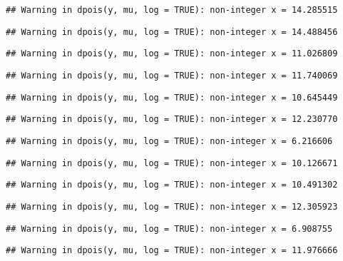 \documentclass[
]{article}
\begin{document}
\begin{verbatim}
## Warning in dpois(y, mu, log = TRUE): non-integer x = 14.285515
\end{verbatim}

\begin{verbatim}
## Warning in dpois(y, mu, log = TRUE): non-integer x = 14.488456
\end{verbatim}

\begin{verbatim}
## Warning in dpois(y, mu, log = TRUE): non-integer x = 11.026809
\end{verbatim}

\begin{verbatim}
## Warning in dpois(y, mu, log = TRUE): non-integer x = 11.740069
\end{verbatim}

\begin{verbatim}
## Warning in dpois(y, mu, log = TRUE): non-integer x = 10.645449
\end{verbatim}

\begin{verbatim}
## Warning in dpois(y, mu, log = TRUE): non-integer x = 12.230770
\end{verbatim}

\begin{verbatim}
## Warning in dpois(y, mu, log = TRUE): non-integer x = 6.216606
\end{verbatim}

\begin{verbatim}
## Warning in dpois(y, mu, log = TRUE): non-integer x = 10.126671
\end{verbatim}

\begin{verbatim}
## Warning in dpois(y, mu, log = TRUE): non-integer x = 10.491302
\end{verbatim}

\begin{verbatim}
## Warning in dpois(y, mu, log = TRUE): non-integer x = 12.305923
\end{verbatim}

\begin{verbatim}
## Warning in dpois(y, mu, log = TRUE): non-integer x = 6.908755
\end{verbatim}

\begin{verbatim}
## Warning in dpois(y, mu, log = TRUE): non-integer x = 11.976666
\end{verbatim}
\end{document}
